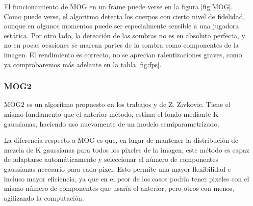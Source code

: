 El funcionamiento de MOG en un frame puede verse en la figura \ref{fig:MOG}. Como puede verse, el algoritmo detecta los cuerpos con cierto nivel de fidelidad, aunque en algunos momentos puede ser especialmente sensible a una jugadora estática. Por otro lado, la detección de las sombras no es en absoluto perfecta, y no en pocas ocasiones se marcan partes de la sombra como componentes de la imagen. El rendimiento es correcto, no se aprecian ralentizaciones graves, como ya comprobaremos más adelante en la tabla \ref{fig:fps}.

\subsubsection*{MOG2}
MOG2 es un algoritmo propuesto en los trabajos \cite{art:Zivkovic1} y \cite{art:Zivkovic2} de Z. Zivkovic. Tiene el mismo fundamento que el anterior método, estima el fondo mediante K gaussianas, haciendo uso nuevamente de un modelo semiparametrizado. 

La diferencia respecto a MOG es que, en lugar de mantener la distribución de mezcla de K gaussianas para todos los pixeles de la imagen, este método es capaz de adaptarse automáticamente y seleccionar el número de componentes gaussianas necesario para cada pixel. Esto permite una mayor flexibilidad e incluso mayor eficiencia, ya que en el peor de los casos podría tener pixeles con el mismo número de componentes que usaría el anterior, pero otros con menos, agilizando la computación.


